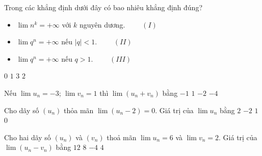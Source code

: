 \begin{ex}%
	Trong các khẳng định dưới đây có bao nhiêu  khẳng định đúng?
	\begin{itemize}
		\item $\lim{n^k}=+\infty $ với $k$ nguyên dương.  $\qquad (I)$
		\item $\lim{q^n}=+\infty $ nếu $\left| q\right|<1$. $\qquad (II)$ 
		\item $\lim{q^n}=+\infty  $ nếu $q>1$. $\qquad (III)$
	\end{itemize}
	\choice 
		 {$0$}
		{$1$} 
		 {$3$}
		 {\True $2$}
\end{ex}

\begin{ex}%
	Nếu $\lim  u_n=-3 $; $\lim v_n=1$ thì $\lim\left(u_n+v_n\right)$ bằng
	\choice 
		{$-1$} 
		{$1$} 
		 {\True $-2$}
		 {$-4$}
\end{ex}

\begin{ex}%
	Cho dãy số $\left(u_n\right)$ thỏa mãn $\lim\left(u_n-2\right)=0$. Giá trị của $\lim u_n$ bằng 
	 \choice
		{\True $2$} 
		 {$-2$}
		 {$1$}
		{$0$} 
\end{ex}

\begin{ex}%
	 Cho hai dãy số $\left(u_n\right)$ và $\left(v_n\right)$ thoả mãn $\lim u_n=6$ và $\lim v_n=2$. Giá trị của $\lim\left(u_n-v_n\right)$ bằng
	\choice 
		 {$12$}
		{$8$} 
		 {$-4$}
		{\True  $4$}
\end{ex}

